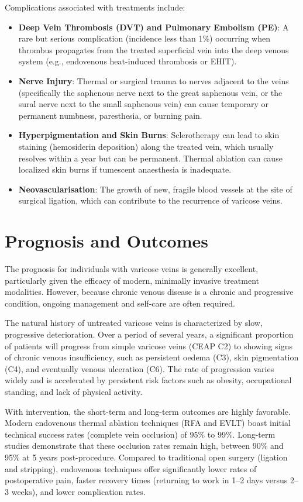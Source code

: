 Complications associated with treatments include:
\begin{itemize}
\item \textbf{Deep Vein Thrombosis (DVT) and Pulmonary Embolism (PE)}: A rare but serious complication (incidence less than 1\%) occurring when thrombus propagates from the treated superficial vein into the deep venous system (e.g., endovenous heat-induced thrombosis or EHIT).
\item \textbf{Nerve Injury}: Thermal or surgical trauma to nerves adjacent to the veins (specifically the saphenous nerve next to the great saphenous vein, or the sural nerve next to the small saphenous vein) can cause temporary or permanent numbness, paresthesia, or burning pain.
\item \textbf{Hyperpigmentation and Skin Burns}: Sclerotherapy can lead to skin staining (hemosiderin deposition) along the treated vein, which usually resolves within a year but can be permanent. Thermal ablation can cause localized skin burns if tumescent anaesthesia is inadequate.
\item \textbf{Neovascularisation}: The growth of new, fragile blood vessels at the site of surgical ligation, which can contribute to the recurrence of varicose veins.
\end{itemize}

\section*{Prognosis and Outcomes}
The prognosis for individuals with varicose veins is generally excellent, particularly given the efficacy of modern, minimally invasive treatment modalities. However, because chronic venous disease is a chronic and progressive condition, ongoing management and self-care are often required.

The natural history of untreated varicose veins is characterized by slow, progressive deterioration. Over a period of several years, a significant proportion of patients will progress from simple varicose veins (CEAP C2) to showing signs of chronic venous insufficiency, such as persistent oedema (C3), skin pigmentation (C4), and eventually venous ulceration (C6). The rate of progression varies widely and is accelerated by persistent risk factors such as obesity, occupational standing, and lack of physical activity.

With intervention, the short-term and long-term outcomes are highly favorable. Modern endovenous thermal ablation techniques (RFA and EVLT) boast initial technical success rates (complete vein occlusion) of 95\% to 99\%. Long-term studies demonstrate that these occlusion rates remain high, between 90\% and 95\% at 5 years post-procedure. Compared to traditional open surgery (ligation and stripping), endovenous techniques offer significantly lower rates of postoperative pain, faster recovery times (returning to work in 1--2 days versus 2--3 weeks), and lower complication rates.

